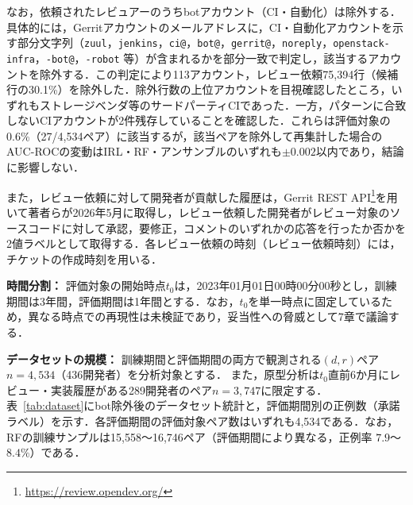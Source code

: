\documentclass[submit,noauthor,ses,dvipdfmx]{ipsj}
\newcommand{\todo}[1]{\colorbox{yellow}{{\bf TODO}:}{\color{red} {\textbf{[#1]}}}}
\begin{document}
なお，依頼されたレビュアーのうちbotアカウント（CI・自動化）は除外する．具体的には，Gerritアカウントのメールアドレスに，CI・自動化アカウントを示す部分文字列（\texttt{zuul}，\texttt{jenkins}，\texttt{ci@}，\texttt{bot@}，\texttt{gerrit@}，\texttt{noreply}，\texttt{openstack-infra}，\texttt{-bot@}，\texttt{-robot} 等）が含まれるかを部分一致で判定し，該当するアカウントを除外する．この判定により113アカウント，レビュー依頼75,394行（候補行の30.1\%）を除外した．除外行数の上位アカウントを目視確認したところ，いずれもストレージベンダ等のサードパーティCIであった．一方，パターンに合致しないCIアカウントが2件残存していることを確認した．これらは評価対象の0.6\%（27/4,534ペア）に該当するが，該当ペアを除外して再集計した場合のAUC-ROCの変動はIRL・RF・アンサンブルのいずれも$\pm 0.002$以内であり，結論に影響しない．

また，レビュー依頼に対して開発者が貢献した履歴は，Gerrit REST API\footnote{\url{https://review.opendev.org/}}を用いて著者らが2026年5月に取得し，レビュー依頼した開発者がレビュー対象のソースコードに対して承認，要修正，コメントのいずれかの応答を行ったか否かを2値ラベルとして取得する．各レビュー依頼の時刻（レビュー依頼時刻）には，チケットの作成時刻を用いる．

\noindent\textbf{時間分割：}
評価対象の開始時点$t_0$は，2023年01月01日00時00分00秒とし，訓練期間は3年間，評価期間は1年間とする．なお，$t_0$を単一時点に固定しているため，異なる時点での再現性は未検証であり，妥当性への脅威として7章で議論する．

\noindent\textbf{データセットの規模：}
訓練期間と評価期間の両方で観測される$(d, r)$ペア$n = 4,534$（436開発者）を分析対象とする．
また，原型分析は$t_0$直前6か月にレビュー・実装履歴がある289開発者のペア$n = 3,747$に限定する．
表~\ref{tab:dataset}にbot除外後のデータセット統計と，評価期間別の正例数（承諾ラベル）を示す．各評価期間の評価対象ペア数はいずれも4,534である．なお，RFの訓練サンプルは15,558〜16,746ペア（評価期間により異なる，正例率 $7.9$〜$8.4\%$）である．
\end{document}
